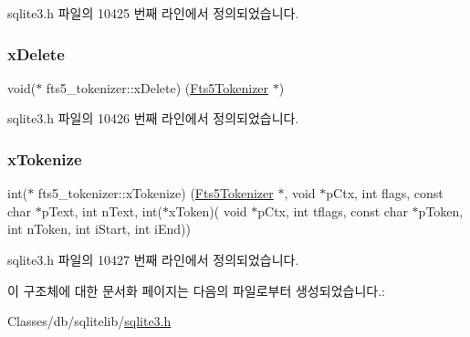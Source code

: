 sqlite3.\+h 파일의 10425 번째 라인에서 정의되었습니다.

\mbox{\label{structfts5__tokenizer_aaaa88b9f3e50f0b1120a05fb1bbb251f}} 
\subsubsection{\texorpdfstring{x\+Delete}{xDelete}}
{\footnotesize\ttfamily void($\ast$ fts5\+\_\+tokenizer\+::x\+Delete) (\hyperlink{sqlite3_8h_ac015f88c5332d612a3125fc0014e468c}{Fts5\+Tokenizer} $\ast$)}



sqlite3.\+h 파일의 10426 번째 라인에서 정의되었습니다.

\mbox{\label{structfts5__tokenizer_ae65ca5a9b1e6d5c1ef09731fccefa577}} 
\subsubsection{\texorpdfstring{x\+Tokenize}{xTokenize}}
{\footnotesize\ttfamily int($\ast$ fts5\+\_\+tokenizer\+::x\+Tokenize) (\hyperlink{sqlite3_8h_ac015f88c5332d612a3125fc0014e468c}{Fts5\+Tokenizer} $\ast$, void $\ast$p\+Ctx, int flags, const char $\ast$p\+Text, int n\+Text, int($\ast$x\+Token)( void $\ast$p\+Ctx, int tflags, const char $\ast$p\+Token, int n\+Token, int i\+Start, int i\+End))}



sqlite3.\+h 파일의 10427 번째 라인에서 정의되었습니다.



이 구조체에 대한 문서화 페이지는 다음의 파일로부터 생성되었습니다.\+:\begin{DoxyCompactItemize}
\item 
Classes/db/sqlitelib/\hyperlink{sqlite3_8h}{sqlite3.\+h}\end{DoxyCompactItemize}
